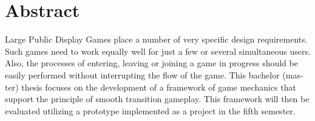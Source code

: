 \chapter{Abstract}

\begin{english}
Large Public Display Games place a number of very specific design
requirements. Such games need to work equally well for just a few or several
simultaneous users. Also, the processes of entering, leaving or joining a
game in progress should be easily performed without interrupting the flow of
the game. This bachelor (master) thesis focuses on the development of a
framework of game mechanics that support the principle of smooth transition
gameplay. This framework will then be evaluated utilizing a prototype
implemented as a project in the fifth semester.
\end{english}

